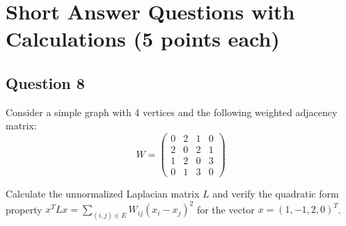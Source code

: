 \documentclass[11pt]{article}
\begin{document}
\section{Short Answer Questions with Calculations (5 points each)}

\subsection{Question 8}
Consider a simple graph with 4 vertices and the following weighted adjacency matrix:
$$W = \begin{pmatrix}
0 & 2 & 1 & 0 \\
2 & 0 & 2 & 1 \\
1 & 2 & 0 & 3 \\
0 & 1 & 3 & 0
\end{pmatrix}$$

Calculate the unnormalized Laplacian matrix $L$ and verify the quadratic form property $x^T L x = \sum_{(i,j) \in E} W_{ij}(x_i - x_j)^2$ for the vector $x = (1, -1, 2, 0)^T$.
\end{document}
